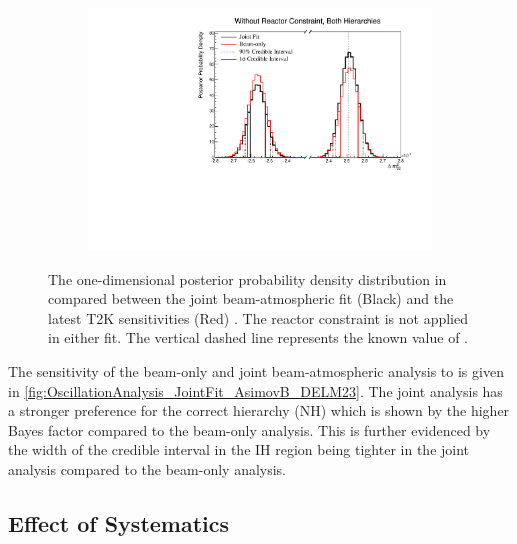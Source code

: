 \begin{figure}[h]
  \begin{subfigure}[t]{0.98\textwidth}
    \includegraphics[width=\textwidth, trim={0mm 0mm 0mm 0mm}, clip,page=1]{Figures/OA/JointFit_OA2020_Comp_AsimovB/ContourComparison_1D_dm32_BH_2_woRC_UnSmeared_CredibleInterval.pdf}
  \end{subfigure}
  \caption{The one-dimensional posterior probability density distribution in  compared between the joint beam-atmospheric fit (Black) and the latest T2K sensitivities (Red) \cite{Dunne2020-uf, t2k_tn_393}. The reactor constraint is not applied in either fit. The vertical dashed line represents the known value of .}
  \label{fig:OscillationAnalysis_JointFit_AsimovB_DELM23}
\end{figure}

The sensitivity of the beam-only and joint beam-atmospheric analysis to  is given in \autoref{fig:OscillationAnalysis_JointFit_AsimovB_DELM23}. The joint analysis has a stronger preference for the correct hierarchy (NH) which is shown by the higher Bayes factor compared to the beam-only analysis. This is further evidenced by the width of the  credible interval in the IH region being tighter in the joint analysis compared to the beam-only analysis.

\clearpage
\subsection{Effect of Systematics}
\label{sec:EffectOfSystematics}

